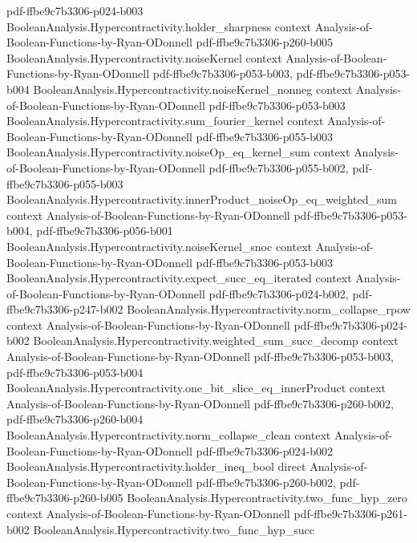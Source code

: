 \begin{theorem}
{    pdf-ffbe9c7b3306-p024-b003}
\proofstep
  {BooleanAnalysis.Hypercontractivity.holder_sharpness}
  {context}
  {Analysis-of-Boolean-Functions-by-Ryan-ODonnell}
  {pdf-ffbe9c7b3306-p260-b005}
\proofstep
  {BooleanAnalysis.Hypercontractivity.noiseKernel}
  {context}
  {Analysis-of-Boolean-Functions-by-Ryan-ODonnell}
  {pdf-ffbe9c7b3306-p053-b003,
    pdf-ffbe9c7b3306-p053-b004}
\proofstep
  {BooleanAnalysis.Hypercontractivity.noiseKernel_nonneg}
  {context}
  {Analysis-of-Boolean-Functions-by-Ryan-ODonnell}
  {pdf-ffbe9c7b3306-p053-b003}
\proofstep
  {BooleanAnalysis.Hypercontractivity.sum_fourier_kernel}
  {context}
  {Analysis-of-Boolean-Functions-by-Ryan-ODonnell}
  {pdf-ffbe9c7b3306-p055-b003}
\proofstep
  {BooleanAnalysis.Hypercontractivity.noiseOp_eq_kernel_sum}
  {context}
  {Analysis-of-Boolean-Functions-by-Ryan-ODonnell}
  {pdf-ffbe9c7b3306-p055-b002,
    pdf-ffbe9c7b3306-p055-b003}
\proofstep
  {BooleanAnalysis.Hypercontractivity.innerProduct_noiseOp_eq_weighted_sum}
  {context}
  {Analysis-of-Boolean-Functions-by-Ryan-ODonnell}
  {pdf-ffbe9c7b3306-p053-b004,
    pdf-ffbe9c7b3306-p056-b001}
\proofstep
  {BooleanAnalysis.Hypercontractivity.noiseKernel_snoc}
  {context}
  {Analysis-of-Boolean-Functions-by-Ryan-ODonnell}
  {pdf-ffbe9c7b3306-p053-b003}
\proofstep
  {BooleanAnalysis.Hypercontractivity.expect_succ_eq_iterated}
  {context}
  {Analysis-of-Boolean-Functions-by-Ryan-ODonnell}
  {pdf-ffbe9c7b3306-p024-b002,
    pdf-ffbe9c7b3306-p247-b002}
\proofstep
  {BooleanAnalysis.Hypercontractivity.norm_collapse_rpow}
  {context}
  {Analysis-of-Boolean-Functions-by-Ryan-ODonnell}
  {pdf-ffbe9c7b3306-p024-b002}
\proofstep
  {BooleanAnalysis.Hypercontractivity.weighted_sum_succ_decomp}
  {context}
  {Analysis-of-Boolean-Functions-by-Ryan-ODonnell}
  {pdf-ffbe9c7b3306-p053-b003,
    pdf-ffbe9c7b3306-p053-b004}
\proofstep
  {BooleanAnalysis.Hypercontractivity.one_bit_slice_eq_innerProduct}
  {context}
  {Analysis-of-Boolean-Functions-by-Ryan-ODonnell}
  {pdf-ffbe9c7b3306-p260-b002,
    pdf-ffbe9c7b3306-p260-b004}
\proofstep
  {BooleanAnalysis.Hypercontractivity.norm_collapse_clean}
  {context}
  {Analysis-of-Boolean-Functions-by-Ryan-ODonnell}
  {pdf-ffbe9c7b3306-p024-b002}
\proofstep
  {BooleanAnalysis.Hypercontractivity.holder_ineq_bool}
  {direct}
  {Analysis-of-Boolean-Functions-by-Ryan-ODonnell}
  {pdf-ffbe9c7b3306-p260-b002,
    pdf-ffbe9c7b3306-p260-b005}
\proofstep
  {BooleanAnalysis.Hypercontractivity.two_func_hyp_zero}
  {context}
  {Analysis-of-Boolean-Functions-by-Ryan-ODonnell}
  {pdf-ffbe9c7b3306-p261-b002}
\proofstep
  {BooleanAnalysis.Hypercontractivity.two_func_hyp_succ}

\end{theorem}
